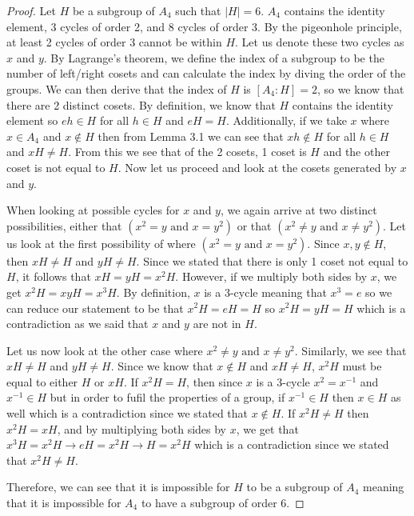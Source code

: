 \begin{proof}
Let $H$ be a subgroup of $A_4$ such that $|H| = 6$. $A_4$ contains the identity element, 3 cycles of order 2, and 8 cycles of order 3. By the pigeonhole principle, at least 2 cycles of order 3 cannot be within $H$. Let us denote these two cycles as $x$ and $y$. By Lagrange's theorem, we define the index of a subgroup to be the number of left/right cosets and can calculate the index by diving the order of the groups. We can then derive that the index of $H$ is $[A_4 : H] = 2$, so we know that there are 2 distinct cosets. By definition, we know that $H$ contains the identity element so $eh \in H$ for all $h\in H$ and $eH = H$. Additionally, if we take $x$ where $x\in A_4$ and $x \not\in H$ then from Lemma 3.1 we can see that $xh \not \in H $  for all $h\in H$ and $xH \neq H$. From this we see that of the 2 cosets, 1 coset is $H$ and the other coset is not equal to $H$. Now let us proceed and look at the cosets generated by $x$ and $y$.

When looking at possible cycles for $x$ and $y$, we again arrive at two distinct possibilities, either that $(x^2 = y \text{ and } x = y^2)$ or that $(x^2 \neq y \text{ and } x \neq y^2)$. Let us look at the first possibility of where $(x^2 = y \text{ and } x = y^2)$. Since $x,y \not\in H$, then $xH \neq H$ and $yH \neq H$. Since we stated that there is only 1 coset not equal to $H$, it follows that $xH = yH = x^2H$. However, if we multiply both sides by $x$, we get $x^2H = xyH = x^3H$. By definition, $x$ is a 3-cycle meaning that $x^3 = e$ so we can reduce our statement to be that $x^2H = eH = H$ so $x^2H = yH = H$ which is a contradiction as we said that $x$ and $y$ are not in $H$.

Let us now look at the other case where $x^2 \neq y \text{ and } x \neq y^2$. Similarly, we see that $xH \neq H$ and $yH \neq H$. Since we know that $x \not\in H$  and $xH \neq H$, $x^2H$ must be equal to either $H$ or $xH$. If $x^2H = H$, then since $x$ is a 3-cycle $x^2 = x^{-1}$ and $x^{-1}\in H$ but in order to fufil the properties of a group, if $x^{-1}\in H$ then $x\in H$ as well which is a contradiction since we stated that $x\not\in H$. If $x^2H \neq H$ then $x^2H = xH$, and by multiplying both sides by $x$, we get that $x^3H = x^2H \rightarrow eH = x^2H \rightarrow H = x^2H$ which is a contradiction since we stated that $x^2H \neq H$.

Therefore, we can see that it is impossible for $H$ to be a subgroup of $A_4$ meaning that it is impossible for $A_4$ to have a subgroup of order 6. 
\end{proof}